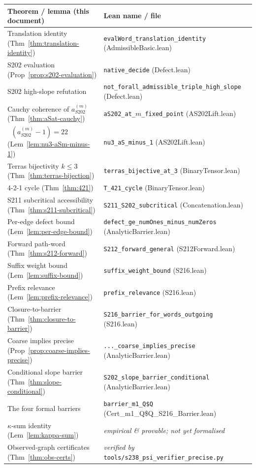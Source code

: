 \documentclass[11pt,a4paper]{article}
\theoremstyle{plain}
\theoremstyle{definition}
\newcommand{\aSat}{a_{S202}^{(m)}}
\DeclareMathOperator{\nuthree}{\nu_3}
\begin{document}
\begin{center}\footnotesize
\begin{tabular}{p{6cm}p{7cm}}
\toprule
Theorem / lemma (this document) & Lean name / file \\
\midrule
Translation identity (Thm~\ref{thm:translation-identity}) &
   \texttt{evalWord\_translation\_identity} (AdmissibleBasic.lean) \\
S202 evaluation (Prop~\ref{prop:s202-evaluation}) &
   \texttt{native\_decide} (Defect.lean) \\
S202 high-slope refutation &
   \texttt{not\_forall\_admissible\_triple\_high\_slope} (Defect.lean) \\
Cauchy coherence of $\aSat$ (Thm~\ref{thm:aSat-cauchy}) &
   \texttt{aS202\_at\_$m$\_fixed\_point} (AS202Lift.lean) \\
$\nuthree(\aSat - 1) = 22$ (Lem~\ref{lem:nu3-aSm-minus-1}) &
   \texttt{nu3\_aS\_minus\_1} (AS202Lift.lean) \\
Terras bijectivity $k \le 3$ (Thm~\ref{thm:terras-bijection}) &
   \texttt{terras\_bijective\_at\_3} (BinaryTensor.lean) \\
4-2-1 cycle (Thm~\ref{thm:421}) &
   \texttt{T\_421\_cycle} (BinaryTensor.lean) \\
S211 subcritical accessibility (Thm~\ref{thm:s211-subcritical}) &
   \texttt{S211\_S202\_subcritical} (Concatenation.lean) \\
Per-edge defect bound (Lem~\ref{lem:per-edge-bound}) &
   \texttt{defect\_ge\_numOnes\_minus\_numZeros} (AnalyticBarrier.lean) \\
Forward path-word (Thm~\ref{thm:s212-forward}) &
   \texttt{S212\_forward\_general} (S212Forward.lean) \\
Suffix weight bound (Lem~\ref{lem:suffix-bound}) &
   \texttt{suffix\_weight\_bound} (S216.lean) \\
Prefix relevance (Lem~\ref{lem:prefix-relevance}) &
   \texttt{prefix\_relevance} (S216.lean) \\
Closure-to-barrier (Thm~\ref{thm:closure-to-barrier}) &
   \texttt{S216\_barrier\_for\_words\_outgoing} (S216.lean) \\
Coarse implies precise (Prop~\ref{prop:coarse-implies-precise}) &
   \texttt{...\_coarse\_implies\_precise} (AnalyticBarrier.lean) \\
Conditional slope barrier (Thm~\ref{thm:slope-conditional}) &
   \texttt{S202\_slope\_barrier\_conditional} (AnalyticBarrier.lean) \\
The four formal barriers &
   \texttt{barrier\_m1\_Q\$Q} (Cert\_m1\_Q\$Q\_S216\_Barrier.lean) \\
$\kappa$-sum identity (Lem~\ref{lem:kappa-sum}) &
   \emph{empirical \& provable; not yet formalised} \\
Observed-graph certificates (Thm~\ref{thm:obs-certs}) &
   \emph{verified by} \texttt{tools/s238\_psi\_verifier\_precise.py} \\
\bottomrule
\end{tabular}
\end{center}
\end{document}
